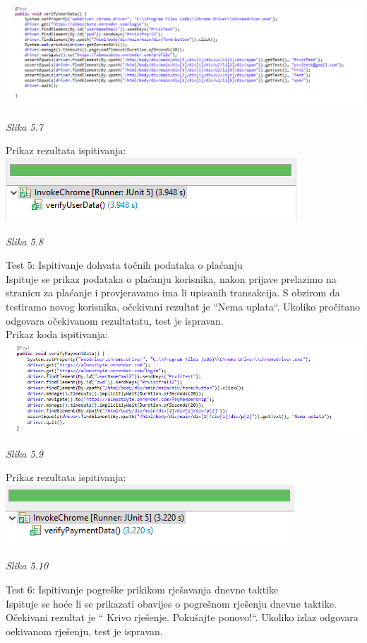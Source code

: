 \documentclass{article}
\begin{document}
	\includegraphics[width=\columnwidth]{userData}
	\begin{center}
		\textit{Slika 5.7}
	\end{center}
	Prikaz rezultata ispitivanja:\\
	
	\includegraphics[width=\columnwidth]{userData-true}
	\begin{center}
		\textit{Slika 5.8}
	\end{center}
	\eject
	Test 5: Ispitivanje dohvata točnih podataka o plaćanju\\
	Ispituje se prikaz podataka o plaćanju korisnika, nakon prijave prelazimo na stranicu za plaćanje i provjeravamo ima li upisanih transakcija. S obzirom da testiramo novog korisnika, očekivani rezultat je “Nema uplata“. Ukoliko pročitano odgovara očekivanom rezultatatu, test je ispravan.\\
	
	Prikaz koda ispitivanja:\\
	
	\includegraphics[width=\columnwidth]{paymentData}
	\begin{center}
		\textit{Slika 5.9}
	\end{center}
	Prikaz rezultata ispitivanja:\\
	
	\includegraphics[width=\columnwidth]{paymentData-true}
	\begin{center}
		\textit{Slika 5.10}
	\end{center}
	\eject
	Test 6: Ispitivanje pogreške prikikom rješavanja dnevne taktike\\
	Ispituje se hoće li se prikazati obavijes o pogrešnom rješenju dnevne taktike. Očekivani rezultat je “ Krivo rješenje. Pokušajte ponovo!“. Ukoliko izlaz odgovara oekivanom rješenju, test je ispravan.\\
	
\end{document}
